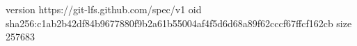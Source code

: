 version https://git-lfs.github.com/spec/v1
oid sha256:c1ab2b42df84b9677880f9b2a61b55004af4f5d6d68a89f62cccf67ffcf162cb
size 257683

